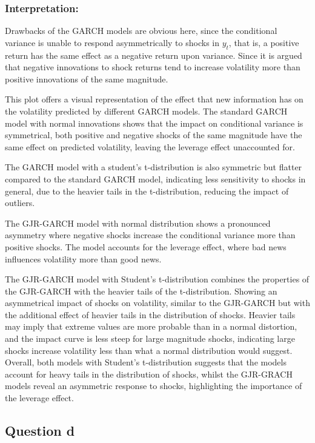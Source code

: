 \documentclass{article}
\begin{document}
\subsubsection*{Interpretation:}
Drawbacks of the GARCH models are obvious here, since the conditional variance is unable to respond asymmetrically to shocks in $y_{t}$, that is, a positive return has the same effect as a negative return upon variance. Since it is argued that negative innovations to shock returns tend to increase volatility more than positive innovations of the same magnitude. 

This plot offers a visual representation of the effect that new information has on the volatility predicted by different GARCH models. 
The standard GARCH model with normal innovations shows that the impact on conditional variance is symmetrical, both positive and negative shocks of the same magnitude have the same effect on predicted volatility, leaving the leverage effect unaccounted for. 

The GARCH model with a student's t-distribution is also symmetric but flatter compared to the standard GARCH model, indicating less sensitivity to shocks in general, due to the heavier tails in the t-distribution, reducing the impact of outliers. 

The GJR-GARCH model with normal distribution shows a pronounced asymmetry where negative shocks increase the conditional variance more than positive shocks. 
The model accounts for the leverage effect, where bad news influences volatility more than good news. 

The GJR-GARCH model with Student's t-distribution combines the properties of the GJR-GARCH with the heavier tails of the t-distribution. Showing an asymmetrical impact of shocks on volatility, similar to the GJR-GARCH but with the additional effect of heavier tails in the distribution of shocks. 
Heavier tails may imply that extreme values are more probable than in a normal distortion, and the impact curve is less steep for large magnitude shocks, indicating large shocks increase volatility less than what a normal distribution would suggest. 
Overall, both models with Student's t-distribution suggests that the models account for heavy tails in the distribution of shocks, whilst the GJR-GRACH models reveal an asymmetric response to shocks, highlighting the importance of the leverage effect. 

\subsection*{Question d}
\end{document}
